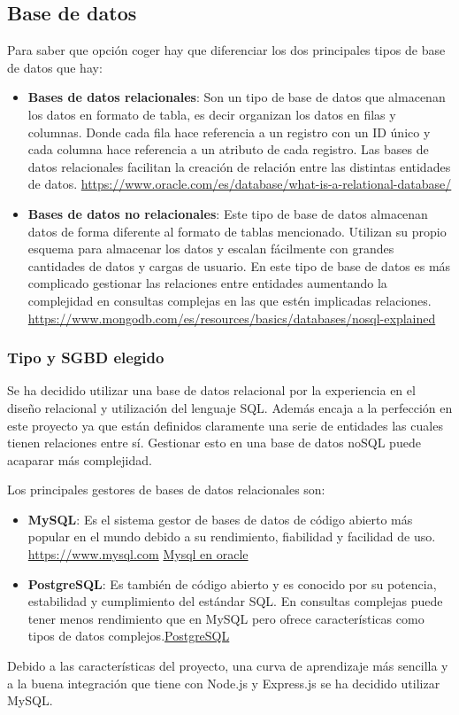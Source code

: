 \subsection{Base de datos}
Para saber que opción coger hay que diferenciar los dos principales tipos de base de datos que hay:
\begin{itemize}
    \item \textbf{Bases de datos relacionales}: Son un tipo de base de datos que almacenan los datos en formato de tabla, es decir organizan los datos en filas y columnas. Donde cada fila hace referencia a un registro con un ID único y cada columna hace referencia a un atributo de cada registro. Las bases de datos relacionales facilitan la creación de relación entre las distintas entidades de datos. \url{https://www.oracle.com/es/database/what-is-a-relational-database/}
    \item \textbf{Bases de datos no relacionales}: Este tipo de base de datos almacenan datos de forma diferente al formato de tablas mencionado. Utilizan su propio esquema para almacenar los datos y escalan fácilmente con grandes cantidades de datos y cargas de usuario. En este tipo de base de datos es más complicado gestionar las relaciones entre entidades aumentando la complejidad en consultas complejas en las que estén implicadas relaciones. 
    \url{https://www.mongodb.com/es/resources/basics/databases/nosql-explained}
\end{itemize}

\subsubsection{Tipo y SGBD elegido}
Se ha decidido utilizar una base de datos relacional por la experiencia en el diseño relacional y utilización del lenguaje SQL. Además encaja a la perfección en este proyecto ya que están definidos claramente una serie de entidades las cuales tienen relaciones entre sí. Gestionar esto en una base de datos noSQL puede acaparar más complejidad.

Los principales gestores de bases de datos relacionales son:
\begin{itemize}
    \item \textbf{MySQL}: Es el sistema gestor de bases de datos de código abierto más popular en el mundo debido a su rendimiento, fiabilidad y facilidad de uso. \href{Mysql}{https://www.mysql.com} \href{https://www.oracle.com/es/mysql/what-is-mysql/}{Mysql en oracle}
    \item \textbf{PostgreSQL}: Es también de código abierto y es conocido por su potencia, estabilidad y cumplimiento del estándar SQL. En consultas complejas puede tener menos rendimiento que en MySQL pero ofrece características como tipos de datos complejos.\href{https://www.postgresql.org/about/}{PostgreSQL}
\end{itemize}
Debido a las características del proyecto, una curva de aprendizaje más sencilla y a la buena integración que tiene con Node.js y Express.js se ha decidido utilizar MySQL.

